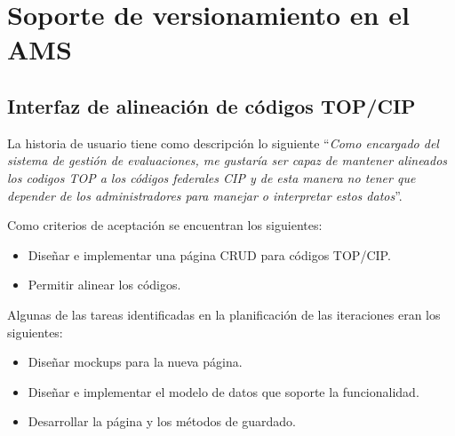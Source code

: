 \section{Soporte de versionamiento en el AMS}
\begin{table}[H]
\centering
{}
\caption{Historias de usuario para soporte de versionamiento en el AMS}
\label{epic:10}
\end{table}

\subsection{Interfaz de alineación de códigos TOP/CIP}
La historia de usuario tiene como descripción lo siguiente \enquote{\textit{Como encargado del sistema de gestión de evaluaciones, me gustaría ser capaz de mantener alineados los codigos TOP a los códigos federales CIP y de esta manera no tener que depender de los administradores para manejar o interpretar estos datos}}.

Como criterios de aceptación se encuentran los siguientes:
\begin{itemize}
	\item Diseñar e implementar una página CRUD para códigos TOP/CIP.
	\item Permitir alinear los códigos.
\end{itemize}

Algunas de las tareas identificadas en la planificación de las iteraciones eran los siguientes:
\begin{itemize}
	\item Diseñar mockups para la nueva página.
	\item Diseñar e implementar el modelo de datos que soporte la funcionalidad.
	\item Desarrollar la página y los métodos de guardado.
\end{itemize}

